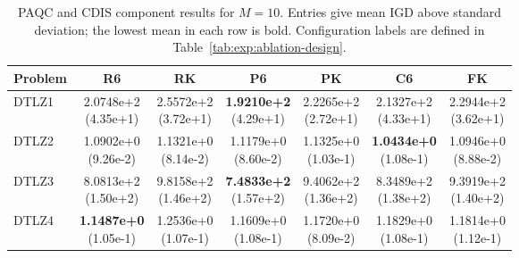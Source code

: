 \begin{table}[p]
\centering
\caption{PAQC and CDIS component results for $M=10$. Entries give mean IGD above standard deviation; the lowest mean in each row is bold. Configuration labels are defined in Table~\ref{tab:exp:ablation-design}.}
\label{tab:exp:abl10}
\footnotesize
\setlength{\tabcolsep}{5pt}
\renewcommand{\arraystretch}{1.12}
\begin{tabular}{lcccccc}
\toprule
Problem & R6 & RK & P6 & PK & C6 & FK \\
\midrule
DTLZ1 & \shortstack{2.0748e+2\\(4.35e+1)} & \shortstack{2.5572e+2\\(3.72e+1)} & \shortstack{\textbf{1.9210e+2}\\(4.29e+1)} & \shortstack{2.2265e+2\\(2.72e+1)} & \shortstack{2.1327e+2\\(4.33e+1)} & \shortstack{2.2944e+2\\(3.62e+1)} \\
DTLZ2 & \shortstack{1.0902e+0\\(9.26e-2)} & \shortstack{1.1321e+0\\(8.14e-2)} & \shortstack{1.1179e+0\\(8.60e-2)} & \shortstack{1.1325e+0\\(1.03e-1)} & \shortstack{\textbf{1.0434e+0}\\(1.08e-1)} & \shortstack{1.0946e+0\\(8.88e-2)} \\
DTLZ3 & \shortstack{8.0813e+2\\(1.50e+2)} & \shortstack{9.8158e+2\\(1.46e+2)} & \shortstack{\textbf{7.4833e+2}\\(1.57e+2)} & \shortstack{9.4062e+2\\(1.36e+2)} & \shortstack{8.3489e+2\\(1.38e+2)} & \shortstack{9.3919e+2\\(1.40e+2)} \\
DTLZ4 & \shortstack{\textbf{1.1487e+0}\\(1.05e-1)} & \shortstack{1.2536e+0\\(1.07e-1)} & \shortstack{1.1609e+0\\(1.08e-1)} & \shortstack{1.1720e+0\\(8.09e-2)} & \shortstack{1.1829e+0\\(1.08e-1)} & \shortstack{1.1814e+0\\(1.12e-1)} \\

\end{tabular}
\end{table}
